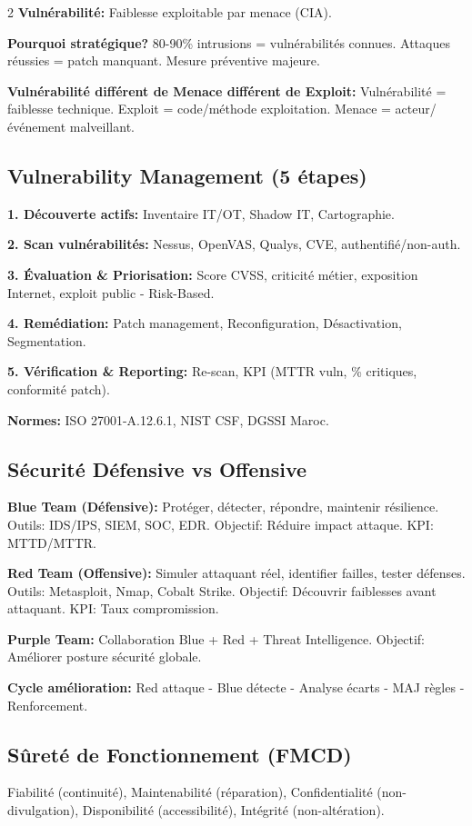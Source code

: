 \documentclass[9pt,a4paper]{extarticle}
\begin{document}
\begin{multicols}{2}
\textbf{Vulnérabilité:} Faiblesse exploitable par menace (CIA).

\textbf{Pourquoi stratégique?} 80-90\% intrusions = vulnérabilités connues. Attaques réussies = patch manquant. Mesure préventive majeure.

\textbf{Vulnérabilité différent de Menace différent de Exploit:} Vulnérabilité = faiblesse technique. Exploit = code/méthode exploitation. Menace = acteur/événement malveillant.

\subsection*{Vulnerability Management (5 étapes)}
\textbf{1. Découverte actifs:} Inventaire IT/OT, Shadow IT, Cartographie.

\textbf{2. Scan vulnérabilités:} Nessus, OpenVAS, Qualys, CVE, authentifié/non-auth.

\textbf{3. Évaluation \& Priorisation:} Score CVSS, criticité métier, exposition Internet, exploit public - Risk-Based.

\textbf{4. Remédiation:} Patch management, Reconfiguration, Désactivation, Segmentation.

\textbf{5. Vérification \& Reporting:} Re-scan, KPI (MTTR vuln, \% critiques, conformité patch).

\textbf{Normes:} ISO 27001-A.12.6.1, NIST CSF, DGSSI Maroc.

\subsection*{Sécurité Défensive vs Offensive}

\textbf{Blue Team (Défensive):} Protéger, détecter, répondre, maintenir résilience. Outils: IDS/IPS, SIEM, SOC, EDR. Objectif: Réduire impact attaque. KPI: MTTD/MTTR.

\textbf{Red Team (Offensive):} Simuler attaquant réel, identifier failles, tester défenses. Outils: Metasploit, Nmap, Cobalt Strike. Objectif: Découvrir faiblesses avant attaquant. KPI: Taux compromission.

\textbf{Purple Team:} Collaboration Blue + Red + Threat Intelligence. Objectif: Améliorer posture sécurité globale.

\textbf{Cycle amélioration:} Red attaque - Blue détecte - Analyse écarts - MAJ règles - Renforcement.

\subsection*{Sûreté de Fonctionnement (FMCD)}
Fiabilité (continuité), Maintenabilité (réparation), Confidentialité (non-divulgation), Disponibilité (accessibilité), Intégrité (non-altération).


\end{multicols}
\end{document}
